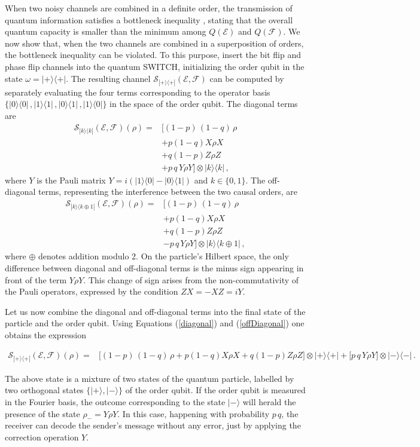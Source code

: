 \documentclass[aps,prl,twocolumn,superscriptaddress,groupedaddress]{revtex4}
\def\EQ#1{\begin{equation}\begin{aligned}#1\end{aligned}\end{equation}}
\def\>{\rangle}
\def\<{\langle}
\newcommand{\ketbra}[2]{|#1\rangle\langle #2|}
\newcommand{\map}[1]{\mathcal{#1}}
\begin{document}
When two noisy channels are combined in a definite order, the transmission of quantum information satisfies a bottleneck inequality \cite{wilde2013quantum}, stating that the overall quantum capacity is smaller than the minimum among $Q (\map E)$ and $Q(\map F)$.    We now show that, when the two channels are combined in a superposition of orders, the bottleneck inequality can be violated. 
To this purpose, insert the bit flip and phase flip channels into the quantum SWITCH, initializing the order qubit in the state  $\omega=|+\>\<+|$. 
The resulting channel $\map S_{|+\>\<+|}(\map E, \map F)$ can be computed by separately evaluating the four terms corresponding to the operator basis  $\{|0\>\<0| \,,  |1\>\<1| \, , |0\>\<1|\, , |1\>\<0|\}$ in the space of the order qubit. 
The diagonal terms  are 
\EQ{
\label{diagonal}
\map S_{|k\>\<k|}(\map E, \map F)(\rho) =& \Big[ (1-p)  \,(1-q)\,  \rho  \\
  & + p (1-q)  X \rho  X \\
 & + q (1-p)  Z \rho  Z \\
 &+ p\, q\,   Y \rho  Y \Big ] \otimes  |k\>\<k|  \, , 
 }
where    $Y$ is the Pauli matrix $ Y = i (\ketbra{1}{0}- \ketbra{0}{1})$ and  $k  \in  \{0,1\}$. The off-diagonal terms, representing the interference between the two causal orders,    are 
\EQ{
\label{offDiagonal}
\map S_{|k\>\<k\oplus 1|}(\map E, \map F)(\rho) =& \Big[ (1-p)\, (1-q)\,  \rho  \\
 & + p (1-q)  X \rho  X \\
 & + q (1-p)  Z \rho  Z \\
 &-  p\, q\,   Y \rho  Y \Big ] \otimes  |k\>\<k\oplus 1|  \, , 
}
where $\oplus$ denotes addition modulo 2. On the particle's Hilbert space, the only difference between diagonal and off-diagonal terms is the minus sign appearing in front of the term $Y \rho  Y$.  This change of sign  arises from  the non-commutativity of the Pauli operators, expressed by  the condition  $ Z X=- X Z=i Y$.

Let us now combine the diagonal and off-diagonal terms into  the final state of the particle and the order qubit. Using Equations (\ref{diagonal}) and (\ref{offDiagonal}) one obtains the expression
\begin{widetext}
\EQ{
\map S_{|+\>\<+|}(\map E, \map F)(\rho) =    & \Big [ (1-p)\, (1-q)\,  \rho + p (1-q)  X \rho  X + q (1-p)  Z \rho  Z  \Big]  \otimes  |+\>\<+|  + \Big[  p \, q   \,   Y \rho Y \Big] \otimes |-\>\<-|    \, .\label{PauliSwitch}
}
\end{widetext}
The above state is a mixture of two states of the quantum particle, labelled by two orthogonal states  $\{  |+\> , |-\>  \}$ of the order qubit.  If the order qubit is measured in the Fourier basis,  the outcome corresponding to the state $|-\>$ will herald the presence of the state  $\rho_-  =  Y \rho Y$.    In this  case,  happening with probability $p \, q$, the receiver can decode the sender's message without any error, just by applying the correction operation  $Y$.   
\end{document}
